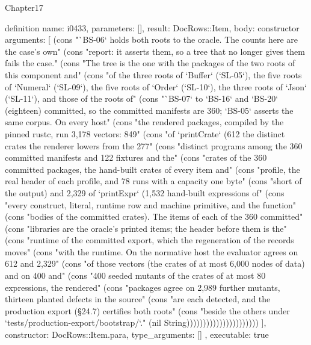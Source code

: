 \begin{lexlean}{Chapter17}
\begin{semanticmodule}
definition{
  name: i0433,
  parameters: [],
  result: DocRows::Item,
  body: constructor{
    arguments: [
      (cons "`BS-06` holds both roots to the oracle. The counts here are the case's own" (cons "report: it asserts them, so a tree that no longer gives them fails the case." (cons "The tree is the one with the packages of the two roots of this component and" (cons "of the three roots of `Buffer` (`SL-05`), the five roots of `Numeral` (`SL-09`), the five roots of `Order` (`SL-10`), the three roots of `Json` (`SL-11`), and those of the roots of" (cons "`BS-07` to `BS-16` and `BS-20` (eighteen) committed, so the committed manifests are 360; `BS-05` asserts the same corpus. On every host" (cons "the rendered packages, compiled by the pinned rustc, run 3,178 vectors: 849" (cons "of `printCrate` (612 the distinct crates the renderer lowers from the 277" (cons "distinct programs among the 360 committed manifests and 122 fixtures and the" (cons "crates of the 360 committed packages, the hand-built crates of every item and" (cons "profile, the real header of each profile, and 78 runs with a capacity one byte" (cons "short of the output) and 2,329 of `printExpr` (1,532 hand-built expressions of" (cons "every construct, literal, runtime row and machine primitive, and the function" (cons "bodies of the committed crates). The items of each of the 360 committed" (cons "libraries are the oracle's printed items; the header before them is the" (cons "runtime of the committed export, which the regeneration of the records moves" (cons "with the runtime. On the normative host the evaluator agrees on 612 and 2,329" (cons "of those vectors (the crates of at most 6,000 nodes of data) and on 400 and" (cons "400 seeded mutants of the crates of at most 80 expressions, the rendered" (cons "packages agree on 2,989 further mutants, thirteen planted defects in the source" (cons "are each detected, and the production export (§24.7) certifies both roots" (cons "beside the others under `tests/production-export/bootstrap/`." (nil String))))))))))))))))))))))
    ],
    constructor: DocRows::Item.para,
    type_arguments: []
  },
  executable: true
}


\end{semanticmodule}
\end{lexlean}
